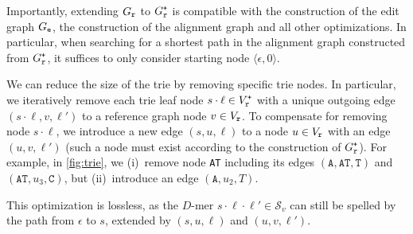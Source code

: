 Importantly, extending $G_\texttt{r}$ to $G_\texttt{r}^\texttt{+}$ is compatible with the construction of the
edit graph $G_\texttt{e}$, the construction of the alignment graph and all other
optimizations. In particular, when searching for a shortest path in the
alignment graph constructed from $G_\texttt{r}^\texttt{+}$, it suffices to only consider starting
node $\langle \epsilon, 0 \rangle$.

 \label{para:reducing_trie}
We can reduce the size of the trie by removing specific trie nodes.
%
In particular, we iteratively remove each trie leaf node $s \cdot \ell \in V_\texttt{r}^\texttt{+}$ with a unique outgoing edge $(s \cdot \ell, v, \ell')$ to a reference graph node $v \in V_\texttt{r}$.
%
To compensate for removing node $s \cdot \ell$, we introduce a new edge $(s, u, \ell)$ to a node $u \in V_\texttt{r}$ with an edge $(u,v,\ell')$ (such a node must exist according to the construction of $G_\texttt{r}^\texttt{+}$).
%
For example, in \cref{fig:trie}, we (i)~remove node \texttt{AT} including its edges $(\texttt{A},\texttt{AT},\texttt{T})$ and $(\texttt{AT},u_3,\texttt{C})$, but (ii)~introduce an edge $(\texttt{A},u_2,T)$.

This optimization is lossless, as the $D$-mer $s \cdot \ell \cdot \ell' \in \mathcal{S}_v$ can still be spelled by the path from $\epsilon$ to $s$, extended by $(s, u, \ell)$ and $(u, v, \ell')$.